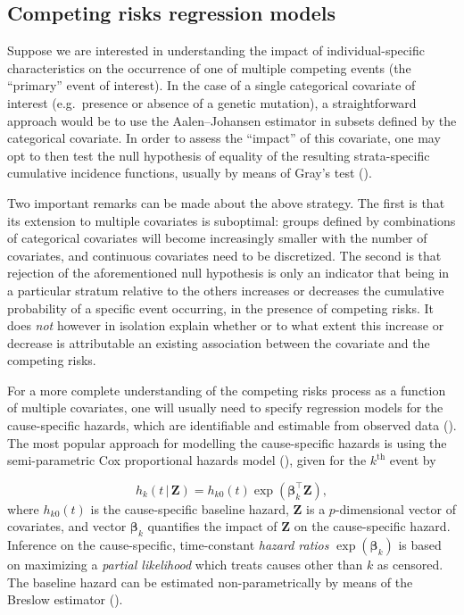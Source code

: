 \documentclass[
  letterpaper,
  DIV=11,
  numbers=noendperiod]{scrreprt}
\newcommand{\given}{\,|\,}
\begin{document}
\subsection{Competing risks regression
models}\label{competing-risks-regression-models}

Suppose we are interested in understanding the impact of
individual-specific characteristics on the occurrence of one of multiple
competing events (the ``primary'' event of interest). In the case of a
single categorical covariate of interest (e.g.~presence or absence of a
genetic mutation), a straightforward approach would be to use the
Aalen--Johansen estimator in subsets defined by the categorical
covariate. In order to assess the ``impact'' of this covariate, one may
opt to then test the null hypothesis of equality of the resulting
strata-specific cumulative incidence functions, usually by means of
Gray's test ().

Two important remarks can be made about the above strategy. The first is
that its extension to multiple covariates is suboptimal: groups defined
by combinations of categorical covariates will become increasingly
smaller with the number of covariates, and continuous covariates need to
be discretized. The second is that rejection of the aforementioned null
hypothesis is only an indicator that being in a particular stratum
relative to the others increases or decreases the cumulative probability
of a specific event occurring, in the presence of competing risks. It
does \emph{not} however in isolation explain whether or to what extent
this increase or decrease is attributable an existing association
between the covariate and the competing risks.

For a more complete understanding of the competing risks process as a
function of multiple covariates, one will usually need to specify
regression models for the cause-specific hazards, which are identifiable
and estimable from observed data
(). The most popular approach for modelling the cause-specific
hazards is using the semi-parametric Cox proportional hazards model
(), given for
the \(k^{\text{th}}\) event by

\[
h_k(t \given \mathbf{Z}) = h_{k0}(t)\exp(\boldsymbol{\beta}_k^\intercal \mathbf{Z}),
\] where \(h_{k0}(t)\) is the cause-specific baseline hazard,
\(\mathbf{Z}\) is a \(p\)-dimensional vector of covariates, and vector
\(\boldsymbol{\beta}_k\) quantifies the impact of \(\mathbf{Z}\) on the
cause-specific hazard. Inference on the cause-specific, time-constant
\emph{hazard ratios} \(\exp(\boldsymbol{\beta}_k)\) is based on
maximizing a \emph{partial likelihood} which treats causes other than
\(k\) as censored. The baseline hazard can be estimated
non-parametrically by means of the Breslow estimator
().
\end{document}
